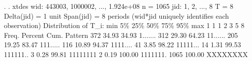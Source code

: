 . 
. xtdes
{\smallskip}
     wid:  443003, 1000002, ..., 1.924e+08                   n =       1065
     jid:  1, 2, ..., 8                                      T =          8
           Delta(jid) = 1 unit
           Span(jid)  = 8 periods
           (wid*jid uniquely identifies each observation)
{\smallskip}
Distribution of T_i:   min      5\%     25\%       50\%       75\%     95\%     max
                         1       1       1         2         3       5       8
{\smallskip}
     Freq.  Percent    Cum. {\VBAR}  Pattern
      372     34.93   34.93 {\VBAR}  1.......
      312     29.30   64.23 {\VBAR}  11......
      205     19.25   83.47 {\VBAR}  111.....
      116     10.89   94.37 {\VBAR}  1111....
       41      3.85   98.22 {\VBAR}  11111...
       14      1.31   99.53 {\VBAR}  111111..
        3      0.28   99.81 {\VBAR}  11111111
        2      0.19  100.00 {\VBAR}  1111111.
     1065    100.00         {\VBAR}  XXXXXXXX
{\smallskip}
